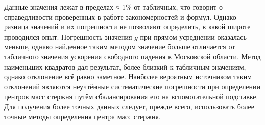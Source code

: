 \documentclass[a4paper, 12pt]{article}
\begin{document}
Данные значения лежат в пределах ≈ 1\% от табличных, что говорит о справедливости проверенных в работе закономерностей и формул. Однако разница значений и их погрешности не позволяют определить, в какой широте проводился опыт. Погрешность значения $g$ при прямом усреднении оказалась меньше, однако найденное таким методом значение больше отличается от табличного значения ускорения свободного падения в Московской области. Метод наименьших квадратов дал результат, более близкий к табличным значениям, однако отклонение всё равно заметное. Наиболее вероятным источником таким отклонений являются неучтённые систематические погрешности при определении центров масс стержня путём сбалансирования его на вспомогательной подставке. Для получения более точных данных следует, прежде всего, использовать более точные методы определения центра масс стержня.
\end{document}
